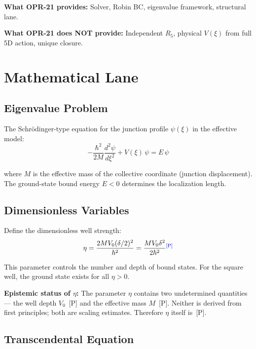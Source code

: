 \textbf{What OPR-21 provides:} Solver, Robin BC, eigenvalue framework, structural
lane.

\textbf{What OPR-21 does NOT provide:} Independent $R_5$, physical $V(\xi)$ from
full 5D action, unique closure.

\section{Mathematical Lane}
\label{sec:L0d:math}

\subsection{Eigenvalue Problem}

The Schr\"odinger-type equation for the junction profile $\psi(\xi)$ in the
effective model:
\begin{equation}
    -\frac{\hbar^2}{2M} \frac{d^2\psi}{d\xi^2} + V(\xi)\,\psi = E\,\psi
    \label{eq:schrodinger}
\end{equation}

where $M$ is the effective mass of the collective coordinate (junction
displacement). The ground-state bound energy $E < 0$ determines the localization
length.

\subsection{Dimensionless Variables}

Define the dimensionless well strength:
\begin{equation}
    \eta = \frac{2M V_0 (\bdelta/2)^2}{\hbar^2}
    = \frac{M V_0 \bdelta^2}{2\hbar^2}
    \label{eq:eta_def}
    \tagP
\end{equation}

This parameter controls the number and depth of bound states. For the
square well, the ground state exists for all $\eta > 0$.

\textbf{Epistemic status of $\eta$:} The parameter $\eta$ contains two
undetermined quantities --- the well depth $V_0$~[P] and the effective mass
$M$~[P]. Neither is derived from first principles; both are scaling estimates.
Therefore $\eta$ itself is~[P].

\subsection{Transcendental Equation}

